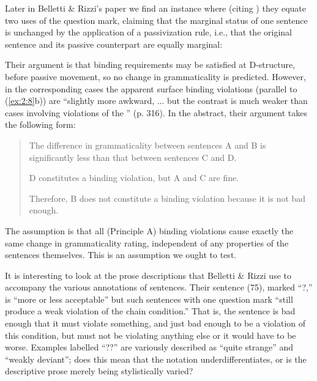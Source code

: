 Later in Belletti \& Rizzi's paper we find an instance where (citing \citet{Burzio1981}) they equate two uses of the question mark, claiming that the marginal status of one sentence is unchanged by the application of a passivization rule, i.e., that the original sentence and its passive counterpart are equally marginal:

\begin{exe}
\ex \label{ex:2:8}
\begin{xlista}
\end{xlista}
\end{exe}

\noindent
Their argument is that binding requirements may be satisfied at D-structure, before passive movement, so no change in grammaticality is predicted. However, in the corresponding  cases the apparent surface binding violations (parallel to (\ref{ex:2:8}b))
are ``slightly more awkward, ... but the contrast is much weaker than cases involving violations of the '' (p. 316). In the abstract, their argument takes the following form:

\begin{quote}
The difference in grammaticality between sentences A and B is significantly less than that between sentences C and D.\medskip

D constitutes a binding violation, but A and C are fine.\medskip

Therefore, B does not constitute a binding violation because it is not bad enough.
\end{quote}


\noindent
The assumption is that all (Principle A) binding violations cause exactly the same change in grammaticality rating, independent of any properties of the sentences themselves. This is an assumption we ought to test.

It is interesting to look at the prose descriptions that Belletti \& Rizzi use to accompany the various annotations of sentences. Their sentence (75), marked ``?,'' is ``more or less acceptable'' but such sentences with one question mark ``still produce a weak violation of the chain condition.'' That is, the sentence is bad enough that it must violate something, and just bad enough to be a violation of this condition, but must not be violating anything else or it would have to be worse. Examples labelled ``??'' are variously described as ``quite strange'' and ``weakly deviant''; does this mean that the notation underdifferentiates, or is the descriptive prose merely being stylistically varied?


